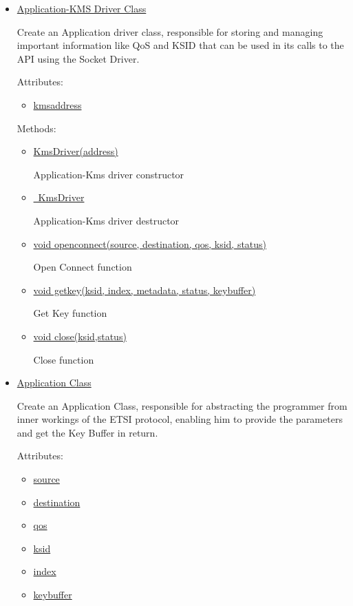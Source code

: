 \begin{refsection}
\begin{itemize}
	\item\underline{Application-KMS Driver Class}
		
		Create an Application driver class, responsible for storing and managing important information like QoS and KSID that can be used in its calls to the API using the Socket Driver.
		
		Attributes:
		\begin{itemize}
			\item\underline{kms\textunderscore address}
		\end{itemize}
		
		Methods:
		\begin{itemize}
		
			\item\underline{KmsDriver(address)}
		
				Application-Kms driver constructor	
		
			\item\underline{~KmsDriver}
		
				Application-Kms driver destructor
		
			\item\underline{void open\textunderscore connect(source, destination, qos, ksid, status)}
		
				Open Connect function
		
			\item\underline{void get\textunderscore key(ksid, index, metadata, status, key\textunderscore buffer)}
		
				Get Key function
		
			\item\underline{void close(ksid,status)}
		
				Close function
		
		\end{itemize}
		
	\item\underline{Application Class}
	
		Create an Application Class, responsible for abstracting the programmer from inner workings of the ETSI protocol, enabling him to provide the parameters and get the Key Buffer in return.
		
		Attributes:
		\begin{itemize}
			\item\underline{source}
			\item\underline{destination}
			\item\underline{qos}
			\item\underline{ksid}
			\item\underline{index}
			\item\underline{key\textunderscore buffer}
		\end{itemize}
		

\end{itemize}
\end{refsection}
